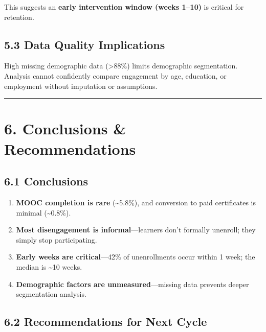 \documentclass[
]{article}
\providecommand{\tightlist}{%
  \setlength{\itemsep}{0pt}\setlength{\parskip}{0pt}}
\begin{document}
This suggests an \textbf{early intervention window (weeks 1--10)} is
critical for retention.

\subsection{5.3 Data Quality
Implications}\label{data-quality-implications}

High missing demographic data (\textgreater88\%) limits demographic
segmentation. Analysis cannot confidently compare engagement by age,
education, or employment without imputation or assumptions.

\begin{center}\rule{0.5\linewidth}{0.5pt}\end{center}

\section{6. Conclusions \&
Recommendations}\label{conclusions-recommendations}

\subsection{6.1 Conclusions}\label{conclusions}

\begin{enumerate}
\def\labelenumi{\arabic{enumi}.}
\tightlist
\item
  \textbf{MOOC completion is rare} (\textasciitilde5.8\%), and
  conversion to paid certificates is minimal (\textasciitilde0.8\%).\\
\item
  \textbf{Most disengagement is informal}---learners don't formally
  unenroll; they simply stop participating.\\
\item
  \textbf{Early weeks are critical}---42\% of unenrollments occur within
  1 week; the median is \textasciitilde10 weeks.\\
\item
  \textbf{Demographic factors are unmeasured}---missing data prevents
  deeper segmentation analysis.
\end{enumerate}

\subsection{6.2 Recommendations for Next
Cycle}\label{recommendations-for-next-cycle}
\end{document}
